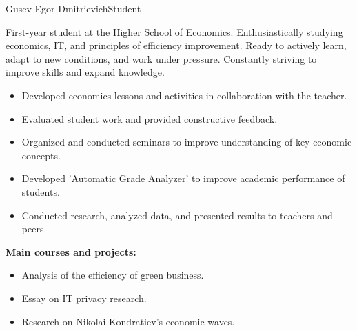 \documentclass{article}
\begin{document}
\begin{cv}[avatar]{Gusev Egor Dmitrievich}{Student}

First-year student at the Higher School of Economics. 
Enthusiastically studying economics, IT, and principles of efficiency improvement. Ready to actively learn, adapt to new conditions, and work under pressure. Constantly striving to improve skills and expand knowledge.


\begin{cvevent}[2022][2021]
    \begin{itemize}
        \item Developed economics lessons and activities in collaboration with the teacher.
        \item Evaluated student work and provided constructive feedback.
        \item Organized and conducted seminars to improve understanding of key economic concepts.
    \end{itemize}
\end{cvevent}

\begin{cvevent}[2022][2022]
    \begin{itemize}
        \item Developed 'Automatic Grade Analyzer' to improve academic performance of students.
        \item Conducted research, analyzed data, and presented results to teachers and peers.
    \end{itemize}
\end{cvevent}


\begin{cvevent}[2022][2020]
    \textbf{Main courses and projects:}
    \begin{itemize}
        \item Analysis of the efficiency of green business.
        \item Essay on IT privacy research.
        \item Research on Nikolai Kondratiev's economic waves.
    \end{itemize}
\end{cvevent}


\end{cv}
\end{document}
